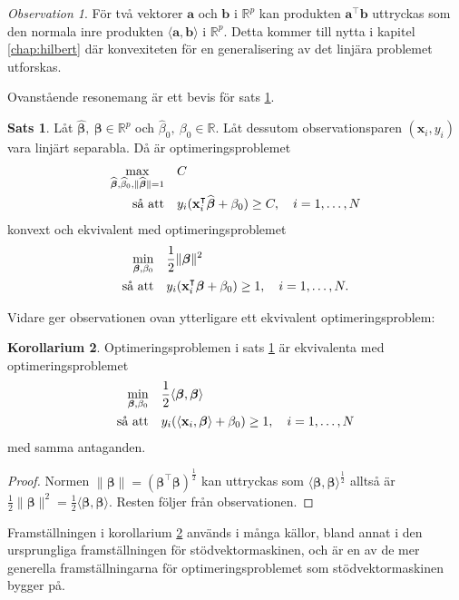 \documentclass[a4paper, 12pt]{report}
\theoremstyle{definition}
\newtheorem{thm}{Sats}[section]
\newtheorem{cor}[thm]{Korollarium}
\theoremstyle{remark}
\newtheorem*{rem}{Observation}
\newcommand{\bfbeta}{{\boldsymbol{\beta}}}
\begin{document}
\begin{rem}
	För två vektorer $\mathbf{a}$ och $\mathbf{b}$ i $\mathbb{R}^p$ kan produkten $\mathbf{a}^\intercal\mathbf{b}$ uttryckas som den normala inre produkten $\langle \mathbf{a}, \mathbf{b} \rangle$ i $\mathbb{R}^p$. Detta kommer till nytta i kapitel \ref{chap:hilbert} där konvexiteten för en generalisering av det linjära problemet utforskas.
\end{rem}

Ovanstående resonemang är ett bevis för sats \ref{thm:primallinearproblem}.
\begin{thm}\label{thm:primallinearproblem}
	Låt $\widehat{\bfbeta},~\bfbeta \in \mathbb{R}^p$ och $\widehat{\beta}_0,~\beta_0 \in \mathbb{R}$. Låt dessutom observationsparen $\left(\mathbf{x}_i, y_i\right)$ vara linjärt separabla. Då är optimeringsproblemet
	\begin{equation*}
	\begin{aligned}
	\operatornamewithlimits{max}_{\widehat{\bfbeta},\widehat{\beta}_0,\|\widehat{\bfbeta}\|=1} & & &C\\
	\text{så att} & & &y_i(\mathbf{x}_i^\intercal\widehat{\bfbeta}+\beta_0)\geq C,\quad i=1,\dots,N
	\end{aligned}
	\end{equation*}
	konvext och ekvivalent med optimeringsproblemet %
	\begin{equation*}
	\begin{aligned}
	\operatornamewithlimits{min}_{\bfbeta,\beta_0} & & &\frac{1}{2}\|\bfbeta\|^2\\
	\text{så att} & & &y_i(\mathbf{x}_i^\intercal\bfbeta+\beta_0)\geq 1,\quad i=1,\dots,N.
	\end{aligned}
	\end{equation*}
\end{thm}
Vidare ger observationen ovan ytterligare ett ekvivalent optimeringsproblem:
\begin{cor}\label{cor:inreproduktoptimering}
	Optimeringsproblemen i sats \ref{thm:primallinearproblem} är ekvivalenta med optimeringsproblemet
	\begin{equation*}
	\begin{aligned}
	\operatornamewithlimits{min}_{\bfbeta,\beta_0} & & &\frac{1}{2}\langle \bfbeta, \bfbeta \rangle\\
	\text{så att} & & &y_i(\langle \mathbf{x}_i,\bfbeta\rangle+\beta_0)\geq 1,\quad i=1,\dots,N
	\end{aligned}
	\end{equation*}
	med samma antaganden.
\end{cor}
\begin{proof}
	Normen $\|\bfbeta\|=(\bfbeta^\intercal\bfbeta)^{\frac{1}{2}}$ kan uttryckas som $\langle \bfbeta, \bfbeta \rangle^{\frac{1}{2}}$ alltså är $\frac{1}{2} \|\bfbeta\|^2=\frac{1}{2}\langle \bfbeta, \bfbeta \rangle$. Resten följer från observationen.
\end{proof}
Framställningen i korollarium \ref{cor:inreproduktoptimering} används i många källor, bland annat i den ursprungliga framställningen för stödvektormaskinen, %
och är en av de mer generella framställningarna för optimeringsproblemet som stödvektormaskinen bygger på. %
\end{document}
